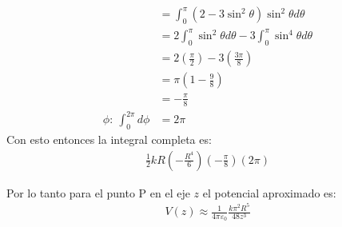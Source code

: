 \documentclass{report}
\begin{document}
\begin{enumerate}
\begin{align*}
			&= \int_0^\pi \left( 2 - 3\sin^2\theta \right) \sin^2\theta d\theta\\
			&= 2 \int_0^\pi \sin^2\theta d\theta - 3\int_0^\pi \sin^4\theta d\theta\\
			&= 2 \left( \frac{\pi}{2} \right) - 3 \left( \frac{3\pi}{8} \right)\\
			&= \pi \left( 1 - \frac{9}{8} \right)\\
			&= - \frac{\pi}{8}\\
			\phi:\ \int_0^{2\pi} d\phi &= 2\pi
		\end{align*}
		Con esto entonces la integral completa es:
		\begin{align*}
			\frac{1}{2}kR \left( - \frac{R^4}{6} \right) \left( - \frac{\pi}{8} \right)\left( 2\pi \right)
		\end{align*}
\end{enumerate}

Por lo tanto para el punto P en el eje $z$ el potencial aproximado es:
\begin{align*}
	V \left( z \right) \approx \frac{1}{4\pi\varepsilon_0 } \frac{k\pi^2 R^5}{48z^3}
\end{align*}
\end{document}
